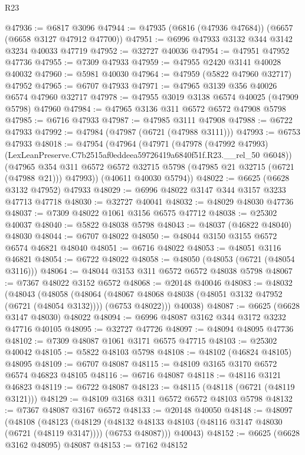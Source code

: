 \begin{lexlean}{R23}
\begin{coremodule}
@47936 := @6817 @3096
@47944 := @47935 (@6816 (@47936 @47684)) (@6657 (@6658 @3127 @47912 @47700))
@47951 := @6996 @47933 @3132 @344 @3142 @3234 @40033 @47719
@47952 := @32727 @40036
@47954 := @47951 @47952 @47736
@47955 := @7309 @47933
@47959 := @47955 @2420 @3141 @40028 @40032
@47960 := @5981 @40030
@47964 := @47959 (@5822 @47960 @32717) @47952
@47965 := @6707 @47933
@47971 := @47965 @3139 @356 @40026 @6574 @47960 @32717
@47978 := @47955 @3019 @3138 @6574 @40025 (@47909 @5798) @47960
@47984 := @47965 @3136 @311 @6572 @6572 @47908 @5798
@47985 := @6716 @47933
@47987 := @47985 @3111 @47908
@47988 := @6722 @47933
@47992 := @47984 (@47987 (@6721 (@47988 @3111)))
@47993 := @6753 @47933
@48018 := @47954
    (@47964
      (@47971
        (@47978
          (@47992 @47993)
          (LexLeanPreserve.C7b2515af0eddeea59726419a6840f51f.R23.__rel_50 @6048))
        (@47965 @354 @311 @6572 @6572 @32715 @5798 (@47985 @21 @32715 (@6721 (@47988 @21))) @47993))
      (@40611 @40030 @5794))
@48022 := @6625 (@6628 @3132 @47952) @47933
@48029 := @6996 @48022 @3147 @344 @3157 @3233 @47713 @47718
@48030 := @32727 @40041
@48032 := @48029 @48030 @47736
@48037 := @7309 @48022 @1061 @3156 @6575 @47712
@48038 := @25302 @40037
@48040 := @5822 @48038 @5798
@48043 := @48037 (@46822 @48040) @48030
@48044 := @6707 @48022
@48050 := @48044 @3150 @3155 @6572 @6574 @46821 @48040
@48051 := @6716 @48022
@48053 := @48051 @3116 @46821
@48054 := @6722 @48022
@48058 := @48050 (@48053 (@6721 (@48054 @3116)))
@48064 := @48044 @3153 @311 @6572 @6572 @48038 @5798
@48067 := @7367 @48022 @3152 @6572
@48068 := @20148 @40046
@48083 := @48032
    (@48043
      (@48058
        (@48064 (@48067 @48068 @48038 (@48051 @3132 @47952 (@6721 (@48054 @3132)))) (@6753 @48022)))
      @40038)
@48087 := @6625 (@6628 @3147 @48030) @48022
@48094 := @6996 @48087 @3162 @344 @3172 @3232 @47716 @40105
@48095 := @32727 @47726
@48097 := @48094 @48095 @47736
@48102 := @7309 @48087 @1061 @3171 @6575 @47715
@48103 := @25302 @40042
@48105 := @5822 @48103 @5798
@48108 := @48102 (@46824 @48105) @48095
@48109 := @6707 @48087
@48115 := @48109 @3165 @3170 @6572 @6574 @46823 @48105
@48116 := @6716 @48087
@48118 := @48116 @3121 @46823
@48119 := @6722 @48087
@48123 := @48115 (@48118 (@6721 (@48119 @3121)))
@48129 := @48109 @3168 @311 @6572 @6572 @48103 @5798
@48132 := @7367 @48087 @3167 @6572
@48133 := @20148 @40050
@48148 := @48097
    (@48108
      (@48123
        (@48129 (@48132 @48133 @48103 (@48116 @3147 @48030 (@6721 (@48119 @3147)))) (@6753 @48087)))
      @40043)
@48152 := @6625 (@6628 @3162 @48095) @48087
@48153 := @7162 @48152

\end{coremodule}
\end{lexlean}
